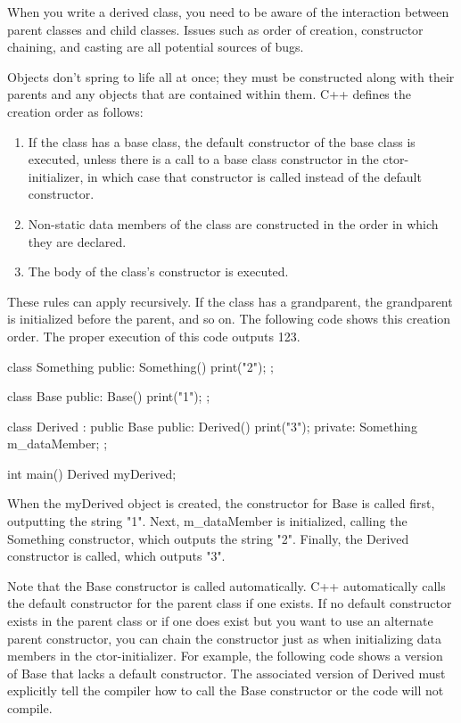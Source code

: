 
When you write a derived class, you need to be aware of the interaction between parent classes and child classes. Issues such as order of creation, constructor chaining, and casting are all potential sources of bugs.


Objects don’t spring to life all at once; they must be constructed along with their parents and any objects that are contained within them. C++ defines the creation order as follows:

\begin{enumerate}
\item
If the class has a base class, the default constructor of the base class is executed, unless there is a call to a base class constructor in the ctor-initializer, in which case that constructor is called instead of the default constructor.

\item
Non-static data members of the class are constructed in the order in which they are declared.

\item
The body of the class’s constructor is executed.
\end{enumerate}

These rules can apply recursively. If the class has a grandparent, the grandparent is initialized before the parent, and so on. The following code shows this creation order. The proper execution of this code outputs 123.

\begin{cpp}
class Something
{
    public:
        Something() { print("2"); }
};

class Base
{
    public:
        Base() { print("1"); }
};

class Derived : public Base
{
    public:
        Derived() { print("3"); }
    private:
        Something m_dataMember;
};

int main()
{
    Derived myDerived;
}
\end{cpp}

When the myDerived object is created, the constructor for Base is called first, outputting the string "1". Next, m\_dataMember is initialized, calling the Something constructor, which outputs the string "2". Finally, the Derived constructor is called, which outputs "3".

Note that the Base constructor is called automatically. C++ automatically calls the default constructor for the parent class if one exists. If no default constructor exists in the parent class or if one does exist but you want to use an alternate parent constructor, you can chain the constructor just as when initializing data members in the ctor-initializer. For example, the following code shows a version of Base that lacks a default constructor. The associated version of Derived must explicitly tell the compiler how to call the Base constructor or the code will not compile.

